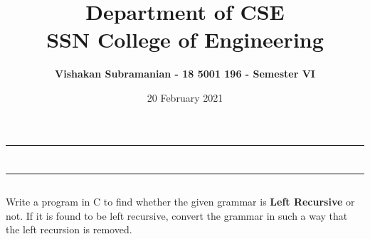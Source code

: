 \documentclass[12pt, a4]{article}
\title{\textbf{Department of CSE\\SSN College of Engineering}}
\author{\textbf{Vishakan Subramanian - 18 5001 196 - Semester VI}}
\date{20 February 2021}
\begin{document}
\maketitle
\hrule
\section*{}
\hrule
\bigskip

\subsection*{}
\subsection*{}
\begin{flushleft}
Write a program in C to find whether the given grammar is \textbf{Left Recursive} or not. If it is found to be left recursive, convert the grammar in such a way that the left recursion is removed.
\end{flushleft}

\newpage
\subsection*{}
\begin{flushleft}

\end{flushleft}

\newpage
\end{document}
